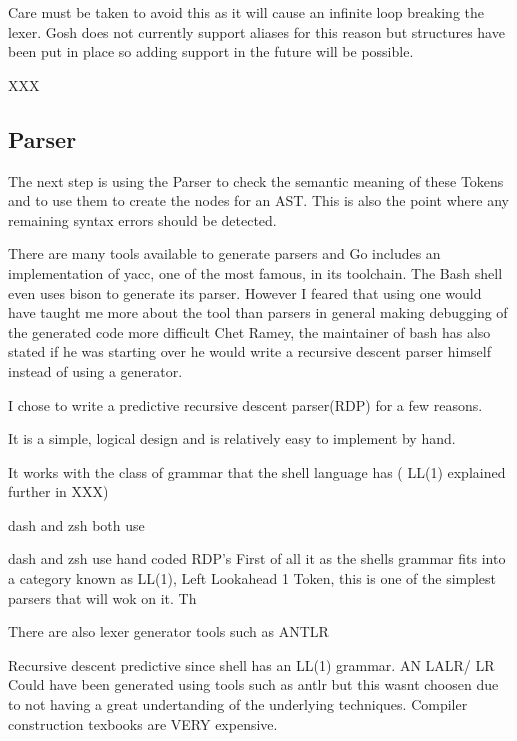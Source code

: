 Care must be taken to avoid this as it will cause an infinite loop breaking the lexer.
Gosh does not currently support aliases for this reason but structures have been put in place so adding support in the future will be possible.

XXX %

\subsection{Parser}
The next step is using the Parser to check the semantic meaning of these Tokens and to use them to create the nodes for an AST.
This is also the point where any remaining syntax errors should be detected.

There are many tools available to generate parsers and Go includes an implementation of yacc, one of the most famous, in its toolchain.
The Bash shell even uses bison to generate its parser.
However I feared that using one would have taught me more about the tool than parsers in general making debugging of the generated code more difficult 
Chet Ramey, the maintainer of bash has also stated if he was starting over he would write a recursive descent parser himself\cite{BASH-ARCH} instead of using a generator.

I chose to write a predictive recursive descent parser(RDP) for a few reasons.
\begin{enumerate*}
	\item It is a simple, logical design and is relatively easy to implement by hand.
    \item It works with the class of grammar that the shell language has (
    LL(1) explained further in XXX)
    \item dash and zsh both use 
\end{enumerate*}
dash and zsh use hand coded RDP's 
First of all it as the shells grammar fits into a category known as LL(1), Left Lookahead 1 Token, this is one of the simplest parsers that will wok on it.
Th

There are also lexer generator tools such as ANTLR 

Recursive descent predictive since shell has an LL(1) grammar.
AN LALR/ LR Could have been generated using tools such as antlr but this wasnt choosen due to not having a great undertanding of the underlying techniques. Compiler construction texbooks are VERY expensive.

